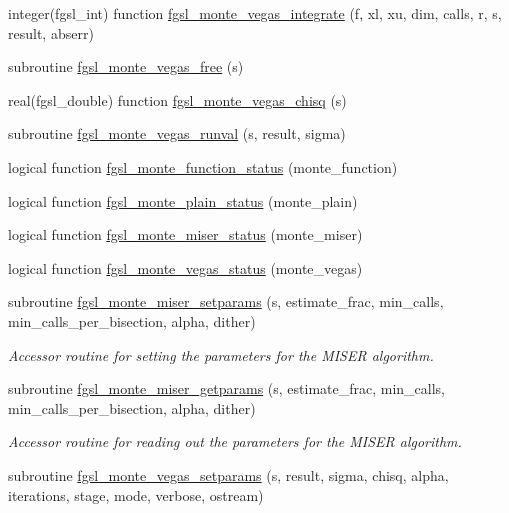 \begin{DoxyCompactItemize}
\item 
integer(fgsl\+\_\+int) function \hyperlink{montecarlo_8finc_a6ca1e03b2c16419ff948d52426d89066}{fgsl\+\_\+monte\+\_\+vegas\+\_\+integrate} (f, xl, xu, dim, calls, r, s, result, abserr)
\item 
subroutine \hyperlink{montecarlo_8finc_a6bcca41c04f47eb0018123519c6c4225}{fgsl\+\_\+monte\+\_\+vegas\+\_\+free} (s)
\item 
real(fgsl\+\_\+double) function \hyperlink{montecarlo_8finc_a2126d5635d3ae538e905c2ab9739628a}{fgsl\+\_\+monte\+\_\+vegas\+\_\+chisq} (s)
\item 
subroutine \hyperlink{montecarlo_8finc_abfa67b6ebc24ac8ecfeb67102151a0db}{fgsl\+\_\+monte\+\_\+vegas\+\_\+runval} (s, result, sigma)
\item 
logical function \hyperlink{montecarlo_8finc_a54997aeeb57044a0d1ea66536cef086d}{fgsl\+\_\+monte\+\_\+function\+\_\+status} (monte\+\_\+function)
\item 
logical function \hyperlink{montecarlo_8finc_a3f0ffca084fe0aa10a2364ae1c12141d}{fgsl\+\_\+monte\+\_\+plain\+\_\+status} (monte\+\_\+plain)
\item 
logical function \hyperlink{montecarlo_8finc_a882c25d3ff7ba5048ee146da2af617d6}{fgsl\+\_\+monte\+\_\+miser\+\_\+status} (monte\+\_\+miser)
\item 
logical function \hyperlink{montecarlo_8finc_a46e22adcca8c7275e4de953205759d11}{fgsl\+\_\+monte\+\_\+vegas\+\_\+status} (monte\+\_\+vegas)
\item 
subroutine \hyperlink{montecarlo_8finc_ad5c6366b571b8d0f4caa29ef51302fcf}{fgsl\+\_\+monte\+\_\+miser\+\_\+setparams} (s, estimate\+\_\+frac, min\+\_\+calls, min\+\_\+calls\+\_\+per\+\_\+bisection, alpha, dither)
\begin{DoxyCompactList}\small\item\em Accessor routine for setting the parameters for the M\+I\+S\+E\+R algorithm. \end{DoxyCompactList}\item 
subroutine \hyperlink{montecarlo_8finc_a408686480497f6952e5dff7bf5d54603}{fgsl\+\_\+monte\+\_\+miser\+\_\+getparams} (s, estimate\+\_\+frac, min\+\_\+calls, min\+\_\+calls\+\_\+per\+\_\+bisection, alpha, dither)
\begin{DoxyCompactList}\small\item\em Accessor routine for reading out the parameters for the M\+I\+S\+E\+R algorithm. \end{DoxyCompactList}\item 
subroutine \hyperlink{montecarlo_8finc_a66bf1b9d3406abbc8ec50759add82650}{fgsl\+\_\+monte\+\_\+vegas\+\_\+setparams} (s, result, sigma, chisq, alpha, iterations, stage, mode, verbose, ostream)

\end{DoxyCompactItemize}
